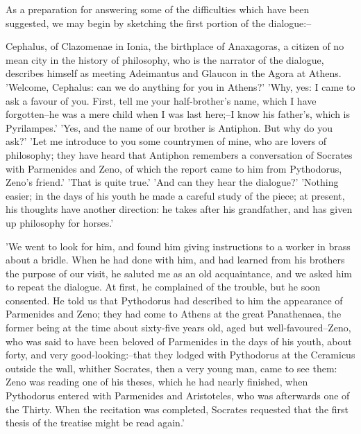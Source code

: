 As a preparation for answering some of the difficulties which have
been suggested, we may begin by sketching the first portion of the
dialogue:--

Cephalus, of Clazomenae in Ionia, the birthplace of Anaxagoras, a
citizen of no mean city in the history of philosophy, who is the
narrator of the dialogue, describes himself as meeting Adeimantus and
Glaucon in the Agora at Athens. 'Welcome, Cephalus: can we do anything
for you in Athens?' 'Why, yes: I came to ask a favour of you. First,
tell me your half-brother's name, which I have forgotten--he was a mere
child when I was last here;--I know his father's, which is Pyrilampes.'
'Yes, and the name of our brother is Antiphon. But why do you ask?'
'Let me introduce to you some countrymen of mine, who are lovers of
philosophy; they have heard that Antiphon remembers a conversation of
Socrates with Parmenides and Zeno, of which the report came to him from
Pythodorus, Zeno's friend.' 'That is quite true.' 'And can they hear the
dialogue?' 'Nothing easier; in the days of his youth he made a careful
study of the piece; at present, his thoughts have another direction: he
takes after his grandfather, and has given up philosophy for horses.'

'We went to look for him, and found him giving instructions to a worker
in brass about a bridle. When he had done with him, and had learned
from his brothers the purpose of our visit, he saluted me as an old
acquaintance, and we asked him to repeat the dialogue. At first, he
complained of the trouble, but he soon consented. He told us that
Pythodorus had described to him the appearance of Parmenides and Zeno;
they had come to Athens at the great Panathenaea, the former being at
the time about sixty-five years old, aged but well-favoured--Zeno, who
was said to have been beloved of Parmenides in the days of his youth,
about forty, and very good-looking:--that they lodged with Pythodorus at
the Ceramicus outside the wall, whither Socrates, then a very young
man, came to see them: Zeno was reading one of his theses, which he
had nearly finished, when Pythodorus entered with Parmenides and
Aristoteles, who was afterwards one of the Thirty. When the recitation
was completed, Socrates requested that the first thesis of the treatise
might be read again.'

